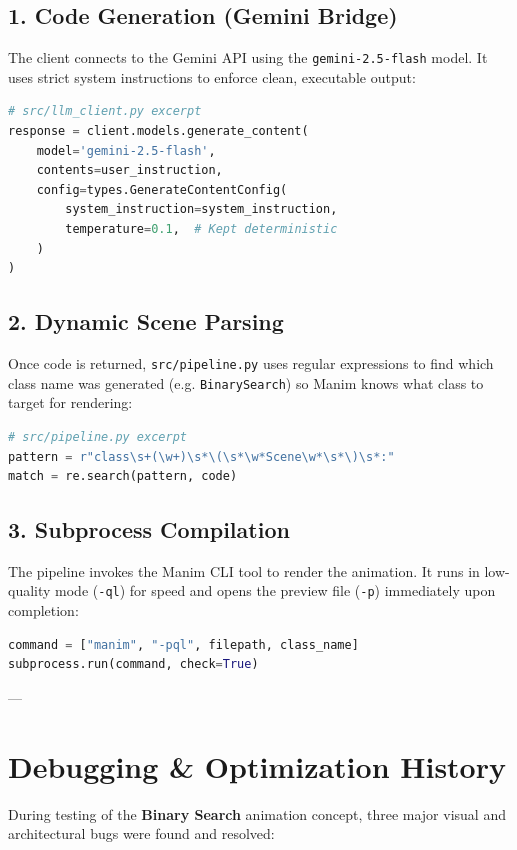 \documentclass[11pt,a4paper]{article}
\begin{document}
\subsection{1. Code Generation (Gemini Bridge)}
The client connects to the Gemini API using the \texttt{gemini-2.5-flash} model. It uses strict system instructions to enforce clean, executable output:

\begin{lstlisting}[language=Python]
# src/llm_client.py excerpt
response = client.models.generate_content(
    model='gemini-2.5-flash',
    contents=user_instruction,
    config=types.GenerateContentConfig(
        system_instruction=system_instruction,
        temperature=0.1,  # Kept deterministic
    )
)
\end{lstlisting}

\subsection{2. Dynamic Scene Parsing}
Once code is returned, \texttt{src/pipeline.py} uses regular expressions to find which class name was generated (e.g. \texttt{BinarySearch}) so Manim knows what class to target for rendering:
\begin{lstlisting}[language=Python]
# src/pipeline.py excerpt
pattern = r"class\s+(\w+)\s*\(\s*\w*Scene\w*\s*\)\s*:"
match = re.search(pattern, code)
\end{lstlisting}

\subsection{3. Subprocess Compilation}
The pipeline invokes the Manim CLI tool to render the animation. It runs in low-quality mode (\texttt{-ql}) for speed and opens the preview file (\texttt{-p}) immediately upon completion:
\begin{lstlisting}[language=Python]
command = ["manim", "-pql", filepath, class_name]
subprocess.run(command, check=True)
\end{lstlisting}

---

\section{Debugging \& Optimization History}

During testing of the \textbf{Binary Search} animation concept, three major visual and architectural bugs were found and resolved:
\end{document}
